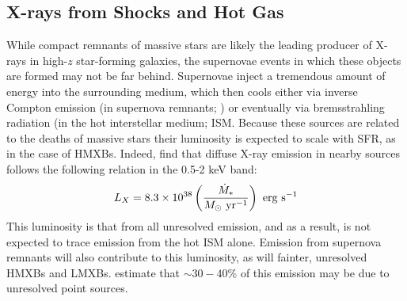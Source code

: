 \subsection{X-rays from Shocks and Hot Gas} \label{sec:ism_bremms}
While compact remnants of massive stars are likely the leading producer of X-rays in high-$z$ star-forming galaxies, the supernovae events in which these objects are formed may not be far behind. Supernovae inject a tremendous amount of energy into the surrounding medium, which then cools either via inverse Compton emission (in supernova remnants; \cite{Oh2001}) or eventually via bremsstrahling radiation (in the hot interstellar medium; ISM. Because these sources are related to the deaths of massive stars their luminosity is expected to scale with SFR, as in the case of HMXBs. Indeed, \cite{Mineo2012b} find that diffuse X-ray emission in nearby sources follows the following relation in the 0.5-2 keV band:
\begin{equation}
	L_X = 8.3 \times 10^{38} \left(\frac{\SFR}{M_{\odot} \ \mathrm{yr}^{-1}} \right) \ \mathrm{erg} \ \mathrm{s}^{-1} \label{eq:LxSFRII_Mineo}
\end{equation}
This luminosity is that from all unresolved emission, and as a result, is not expected to trace emission from the hot ISM alone. Emission from supernova remnants will also contribute to this luminosity, as will fainter, unresolved HMXBs and LMXBs. \cite{Mineo2012b} estimate that $\sim 30-40$\% of this emission may be due to unresolved point sources. 


